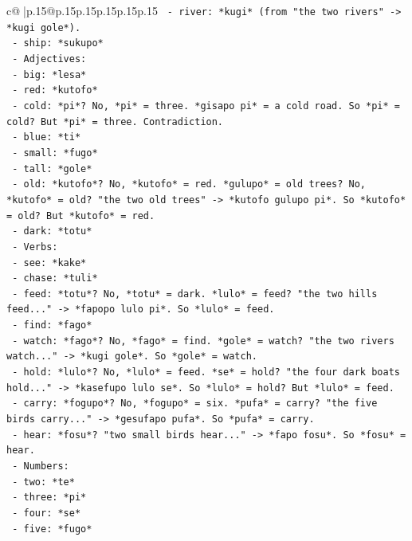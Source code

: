 \documentclass{article}
\begin{document}
{\begin{supertabular}{c@{$\;$}|p{.15\linewidth}@{}p{.15\linewidth}p{.15\linewidth}p{.15\linewidth}p{.15\linewidth}p{.15\linewidth}}
{{{\texttt{      {-} river: *kugi* (from "the two rivers" {-}> *kugi gole*).} \\
\texttt{      {-} ship: *sukupo*} \\
\texttt{    {-} Adjectives:} \\
\texttt{      {-} big: *lesa*} \\
\texttt{      {-} red: *kutofo*} \\
\texttt{      {-} cold: *pi*? No, *pi* = three. *gisapo pi* = a cold road. So *pi* = cold? But *pi* = three. Contradiction.} \\
\texttt{      {-} blue: *ti*} \\
\texttt{      {-} small: *fugo*} \\
\texttt{      {-} tall: *gole*} \\
\texttt{      {-} old: *kutofo*? No, *kutofo* = red. *gulupo* = old trees? No, *kutofo* = old? "the two old trees" {-}> *kutofo gulupo pi*. So *kutofo* = old? But *kutofo* = red.} \\
\texttt{      {-} dark: *totu*} \\
\texttt{    {-} Verbs:} \\
\texttt{      {-} see: *kake*} \\
\texttt{      {-} chase: *tuli*} \\
\texttt{      {-} feed: *totu*? No, *totu* = dark. *lulo* = feed? "the two hills feed..." {-}> *fapopo lulo pi*. So *lulo* = feed.} \\
\texttt{      {-} find: *fago*} \\
\texttt{      {-} watch: *fago*? No, *fago* = find. *gole* = watch? "the two rivers watch..." {-}> *kugi gole*. So *gole* = watch.} \\
\texttt{      {-} hold: *lulo*? No, *lulo* = feed. *se* = hold? "the four dark boats hold..." {-}> *kasefupo lulo se*. So *lulo* = hold? But *lulo* = feed.} \\
\texttt{      {-} carry: *fogupo*? No, *fogupo* = six. *pufa* = carry? "the five birds carry..." {-}> *gesufapo pufa*. So *pufa* = carry.} \\
\texttt{      {-} hear: *fosu*? "two small birds hear..." {-}> *fapo fosu*. So *fosu* = hear.} \\
\texttt{    {-} Numbers:} \\
\texttt{      {-} two: *te*} \\
\texttt{      {-} three: *pi*} \\
\texttt{      {-} four: *se*} \\
\texttt{      {-} five: *fugo*} \\
}}}
\end{supertabular}}
\end{document}
